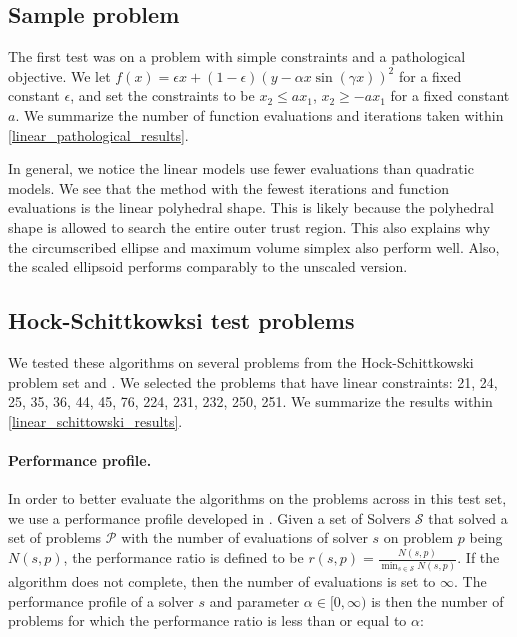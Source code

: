 \subsection{Sample problem}

The first test was on a problem with simple constraints and a pathological objective.
We let $f(x) = \epsilon x + (1-\epsilon)(y - \alpha x \sin(\gamma x))^2$ for a fixed constant $\epsilon$, and set the constraints to be
$x_2 \le ax_1$, $x_2 \ge -ax_1$ for a fixed constant $a$.
We summarize the number of function evaluations and iterations taken within \cref{linear_pathological_results}.

In general, we notice the linear models use fewer evaluations than quadratic models.
We see that the method with the fewest iterations and function evaluations is the linear polyhedral shape.
This is likely because the polyhedral shape is allowed to search the entire outer trust region.
This also explains why the circumscribed ellipse and maximum volume simplex also perform well.
Also, the scaled ellipsoid performs comparably to the unscaled version.

\subsection{Hock-Schittkowksi test problems}


We tested these algorithms on several problems from the Hock-Schittkowski problem set \cite{Schittkowski1981MoreTE} and \cite{Hock1980}.
We selected the problems that have linear constraints: 21, 24, 25, 35, 36, 44, 45, 76, 224, 231, 232, 250, 251.
We summarize the results within \cref{linear_schittowski_results}.


\paragraph*{Performance profile.}
\label{performance_profile}
In order to better evaluate the algorithms on the problems across in this test set, we use a performance profile developed in \cite{More:2009:BDO:1654367.1654371}.
Given a set of Solvers $\mathcal S$ that solved a set of problems $\mathcal P$ with the number of evaluations of solver $s$ on problem $p$ being $N(s, p)$, the performance ratio is defined to be $r(s, p) = \frac{N(s, p)}{\min_{s \in \mathcal S} N(s, p)}$.
If the algorithm does not complete, then the number of evaluations is set to $\infty$.
The performance profile of a solver $s$ and parameter $\alpha \in [0, \infty)$ is then the number of problems for which the performance ratio is less than or equal to $\alpha$: 

